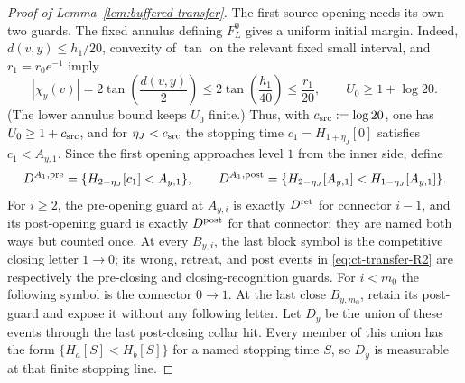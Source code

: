 \begin{proof}[Proof of Lemma~\ref{lem:buffered-transfer}]
The first source opening needs its own two guards.  The fixed annulus
defining $F_L^0$ gives a uniform initial margin.  Indeed,
$d(v,y)\le h_1/20$, convexity of $\tan$ on the relevant fixed small
interval, and $r_1=r_0e^{-1}$ imply
\[
|\chi_y(v)|=2\tan\!\left(\frac{d(v,y)}2\right)
 \le 2\tan\!\left(\frac{h_1}{40}\right)
 \le \frac{r_1}{20},
 \qquad U_0\ge1+\log20.
\]
(The lower annulus bound keeps $U_0$ finite.)  Thus, with
$c_{\rm src}:=\log20$, one has $U_0\ge1+c_{\rm src}$, and for
$\eta_J<c_{\rm src}$ the stopping time
$c_1=H_{1+\eta_J}[0]$ satisfies $c_1<A_{y,1}$.  Since the first
opening approaches level $1$ from the inner side, define
\begin{equation}
D^{A_1,{\rm pre}}=\{H_{2-\eta_J}[c_1]<A_{y,1}\},\qquad
 D^{A_1,{\rm post}}=
 \{H_{2-\eta_J}[A_{y,1}]<H_{1-\eta_J}[A_{y,1}]\}.\label{eq:ct-transfer-R2a}
\end{equation}
For $i\ge2$, the pre-opening guard at $A_{y,i}$ is exactly
$D^{\rm ret}$ for connector $i-1$, and its post-opening guard is
exactly $D^{\rm post}$ for that connector; they are named both ways
but counted once.  At every $B_{y,i}$, the last block symbol is the
competitive closing letter $1\to0$; its wrong, retreat, and post events
in \eqref{eq:ct-transfer-R2} are respectively the pre-closing and closing-recognition guards.
For $i<m_0$ the following symbol is the connector $0\to1$.  At the
last close $B_{y,m_0}$, retain its post-guard and expose it without any
following letter.  Let $D_y$ be the union of these events through the
last post-closing collar hit.  Every member of this union has the form
$\{H_a[S]<H_b[S]\}$ for a named stopping time $S$, so $D_y$ is
measurable at that finite stopping line.


\end{proof}
